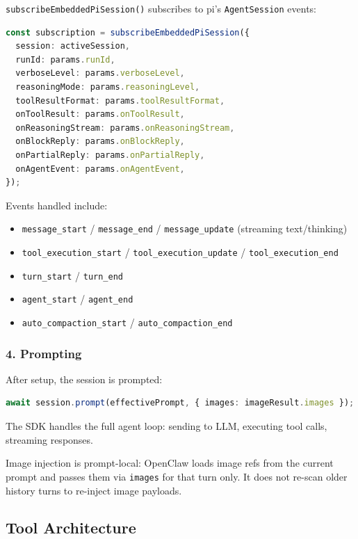 \texttt{subscribeEmbeddedPiSession()} subscribes to pi's \texttt{AgentSession} events:

\begin{lstlisting}[language=typescript]
const subscription = subscribeEmbeddedPiSession({
  session: activeSession,
  runId: params.runId,
  verboseLevel: params.verboseLevel,
  reasoningMode: params.reasoningLevel,
  toolResultFormat: params.toolResultFormat,
  onToolResult: params.onToolResult,
  onReasoningStream: params.onReasoningStream,
  onBlockReply: params.onBlockReply,
  onPartialReply: params.onPartialReply,
  onAgentEvent: params.onAgentEvent,
});
\end{lstlisting}


Events handled include:

\begin{itemize}
  \item \texttt{message\_start} / \texttt{message\_end} / \texttt{message\_update} (streaming text/thinking)
  \item \texttt{tool\_execution\_start} / \texttt{tool\_execution\_update} / \texttt{tool\_execution\_end}
  \item \texttt{turn\_start} / \texttt{turn\_end}
  \item \texttt{agent\_start} / \texttt{agent\_end}
  \item \texttt{auto\_compaction\_start} / \texttt{auto\_compaction\_end}
\end{itemize}


\subsubsection{4. Prompting}


After setup, the session is prompted:

\begin{lstlisting}[language=typescript]
await session.prompt(effectivePrompt, { images: imageResult.images });
\end{lstlisting}


The SDK handles the full agent loop: sending to LLM, executing tool calls, streaming responses.

Image injection is prompt-local: OpenClaw loads image refs from the current prompt and
passes them via \texttt{images} for that turn only. It does not re-scan older history turns
to re-inject image payloads.

\subsection{Tool Architecture}


